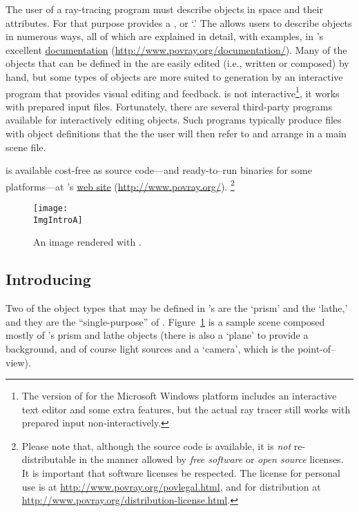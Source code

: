 The user of a ray-tracing program must describe objects in space
and their attributes. For that purpose \IXpov{} provides a
, or `.'
The 
allows users to describe objects in numerous ways, all of which
are explained in detail, with examples, in \IXpov{}'s
excellent \href{http://www.povray.org/documentation/}{documentation}
(\url{http://www.povray.org/documentation/}).
Many of the objects that can be defined in the  are easily
edited (i.e., written or composed) by hand, but some types of objects
are more suited to generation by an interactive program that
provides visual editing and feedback. \IXpov{} is not
interactive\footnote{The version of \IXpov{} for the
Microsoft Windows platform includes an interactive text editor and
some extra features, but the actual ray tracer still works
with prepared input non-interactively.},
it works with prepared input files. Fortunately, there are several
third-party programs available for interactively editing
\IXpov{}  objects. Such programs typically
produce  files with object definitions
that the the user will then refer to and arrange in a main scene file.

\IXpov{} is available cost-free as source code---and
ready-to--run binaries for some platforms---at
\IXpov's \href{http://www.povray.org/}{web site}
(\url{http://www.povray.org/}).
\footnote{Please note that, although the source code is available,
it is \emph{not} re-distributable in the manner allowed
by \emph{free software} or \emph{open source} licenses.
It is important that software licenses be respected.
The \IXpov{} license for personal use is at
\url{http://www.povray.org/povlegal.html}, and for distribution
at \url{http://www.povray.org/distribution-license.html}.}

\begin{figure}[htb]
\centering
\texttt{[image: \\ImgIntroA]}
\caption{An image rendered with \dtypov.}
\label{fig:pov_image_Intro_0}
\end{figure}


	\subsection{Introducing \dtypkgu}
Two of the object types that may be defined in \IXpov's
 are the `prism' and the `lathe,' and they are
the ``single-purpose'' of \IXpkg.
Figure~\ref{fig:pov_image_Intro_0} is a sample scene
composed mostly of \IXpov's prism and lathe objects
(there is also a `plane' to provide a background, and of course
light sources and a `camera', which is the point-of--view).

